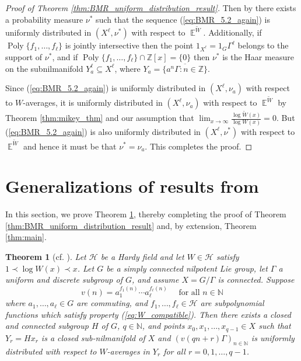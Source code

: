 \documentclass[12pt]{article}
\theoremstyle{plain} %
\newtheorem{theorem}{Theorem}[section]
\theoremstyle{definition} %
\theoremstyle{plain}
\theoremstyle{plain}
\numberwithin{equation}{section}
\newcommand{\N}{\mathbb{N}}
\newcommand{\Z}{\mathbb{Z}}
\renewcommand{\subset}{\subseteq}
\newcommand{\1}{\mathbbm{1}}
\newcommand{\E}{\operatorname{\mathbb{E}}}
\newcommand{\Poly}{\operatorname{Poly}}
\newcommand{\oo}{\infty}
\begin{document}
\begin{proof}[Proof of Theorem \ref{thm:BMR_uniform_distribution_result}]
Then by \cite[Theorem 5.7]{BMR24} there exists a probability measure $\nu^*$ such that the sequence (\ref{eq:BMR_5.2_again}) is uniformly distributed in $(X^{\ell},\nu^*)$ with respect to $\E^{\widetilde{W}}$. Additionally, if $\Poly\{f_1,\dots, f_{\ell}\}$ is jointly intersective then the point
$1_{X^{\ell}} = 1_G\Gamma^{\ell}$ belongs to the support of $\nu^*$, and if $\Poly\{f_1,\dots, f_{\ell}\}\cap \Z[x]=\{0\}$ then $\nu^*$ is the Haar measure on the
subnilmanifold $Y_a^{\ell} \subset X^{\ell}$, where $Y_a = \overline{\{a^n\Gamma : n \in \mathbb{Z}\}}$.

Since (\ref{eq:BMR_5.2_again}) is uniformly distributed in $(X^{\ell},\nu_a)$ with respect to $W$-averages, it is uniformly distributed in $(X^{\ell},\nu_a)$ with respect to $\E^{\widetilde{W}}$ by Theorem \ref{thm:mikey_thm} and our assumption that $\lim_{x\to\oo}\frac{\log \widetilde{W}(x)}{\log W(x)} = 0$. But  (\ref{eq:BMR_5.2_again}) is also uniformly distributed in $(X^{\ell},\nu^*)$ with respect to $\E^{\widetilde{W}}$ and hence it must be that $\nu^* = \nu_a$. This completes the proof.
\end{proof}
\section{Generalizations of results from \texorpdfstring{\cite{Richter23}}{Ric23}}\label{section:richter_results}

In this section, we prove Theorem \ref{thm_generalized_richter_D}, thereby completing the proof of Theorem \ref{thm:BMR_uniform_distribution_result} and, by extension, Theorem \ref{thm:main}.
 \begin{theorem}[cf. {\cite[Theorem D]{Richter23}}]\label{thm_generalized_richter_D}
Let $\mathcal{H}$ be a Hardy field and let $W\in \mathcal{H}$ satisfy $1\prec \log W(x)\prec x$. Let $G$ be a simply connected nilpotent Lie group, let $\Gamma$ a uniform and discrete subgroup of $G$, and assume $X = G/\Gamma$ is connected.
Suppose
$$
v(n) = a_1^{f_1(n)}\cdots a_{\ell}^{f_{\ell}(n)}\quad \text{ for all }n\in \N
$$
where $a_1,\dots , a_{\ell} \in G$ are commuting, and $f_1,\dots , f_{\ell} \in \mathcal{H}$ are subpolynomial functions which satisfy property (\ref{eq:W_compatible}). Then there exists a closed and connected subgroup $H$ of $G$, $q\in \N$, and points $x_0, x_1,\dots , x_{q-1} \in X$ such that $Y_r = H{x_r}$ is a closed sub-nilmanifold of $X$ and $(v(qn + r)\Gamma)_{n\in\N}$ is uniformly
distributed with respect to $W$-averages in $Y_r$ for all $r = 0, 1, \dots , q - 1$.
 \end{theorem}
\end{document}
